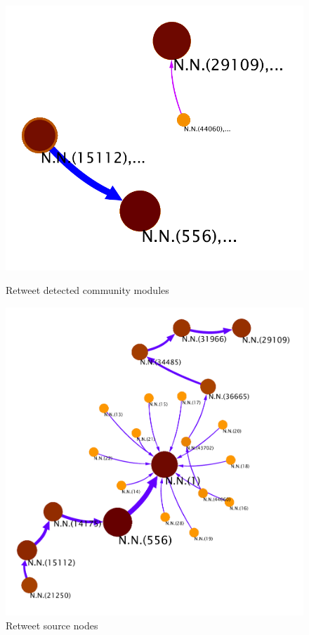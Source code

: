 \begin{figure}[ht]
\centering
\begin{minipage}[b]{0.45\linewidth}
\includegraphics[scale=0.40]{Images/retweets_modules.pdf}
\caption{Retweet detected community modules}
\label{fig:minipage1}
\end{minipage}
\quad
\begin{minipage}[b]{0.45\linewidth}
\includegraphics[scale=0.40]{Images/retweets_source_nodes.pdf}
\caption{Retweet source nodes}
\label{fig:minipage2}
\end{minipage}
\end{figure}

